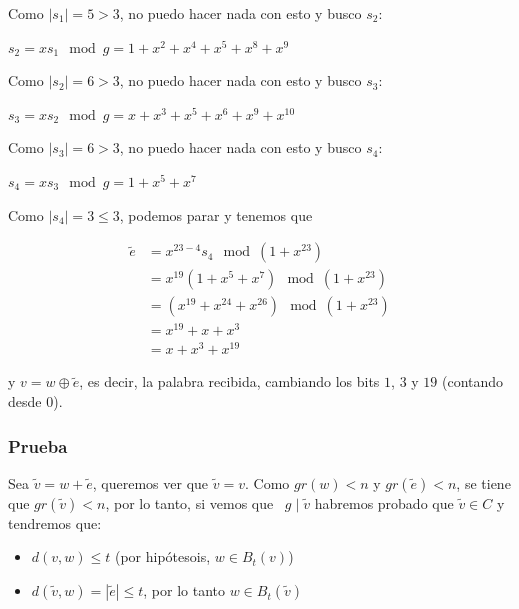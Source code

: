 \documentclass[10pt,a4paper]{article}
\begin{document}
Como $|s_1| = 5 > 3$, no puedo hacer nada con esto y busco $s_2$:

\begin{center}
$s_2 = xs_1 \mod g= 1+ x^{2}+x^{ 4}+x^{ 5}+x^{ 8}+x^{ 9}$
\end{center}

Como $|s_2| = 6 > 3$, no puedo hacer nada con esto y busco $s_3$:

\begin{center}
$s_3 = xs_2 \mod g= x +x^{3}+x^{ 5}+x^{ 6}+x^{ 9}+x^{ 10}$
\end{center}

Como $|s_3| = 6 > 3$, no puedo hacer nada con esto y busco $s_4$:

\begin{center}
$s_4 = xs_3 \mod g= 1 + x^5+x^7$
\end{center}

Como $|s_4| = 3 \leq 3$, podemos parar y tenemos que

\begin{center}
\begin{align*} \tilde{e} &=x^{23-4}s_4 \mod ( 1 + x^{23})\\ &= x^{19}(1+x^5+x^7)\mod (1+x^{23})\\ &= (x^{19} + x^{24} + x^{26}) \mod (1+ x^{23})\\ &= x^{19} + x + x^3\\ &= x + x^3 + x^{19} \end{align*}
\end{center}

y $v = w \oplus \tilde{e}$, es decir, la palabra recibida, cambiando los bits $1$, $3$ y $19$ (contando desde $0$).

\subsubsection*{Prueba}

Sea $\tilde v = w + \tilde e$, queremos ver que $\tilde v = v$. Como $gr(w) < n $ y $gr(\tilde e) < n$, se tiene que $gr(\tilde v) < n$, por lo tanto, si vemos que  $g \;|\; \tilde v$ habremos probado que $\tilde v \in C$ y tendremos que:

\begin{itemize}

	\item $d(v, w) \leq t$ (por hipótesois, $w \in B_t(v)$)
	\item $d(\tilde v, w) = |\tilde e| \leq t$, por lo tanto $w \in B_t(\tilde v)$
\end{itemize}
\end{document}
